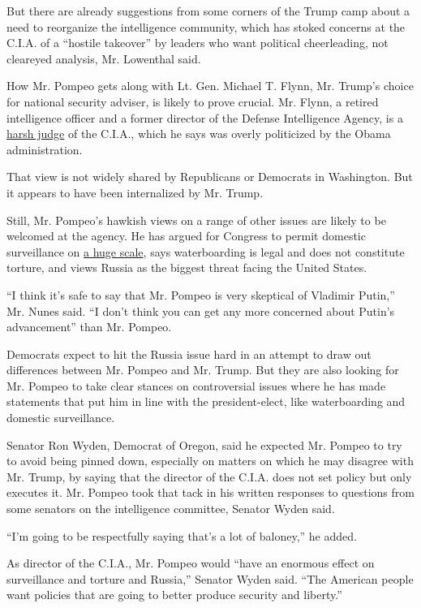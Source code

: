 But there are already suggestions from some corners of the Trump camp
about a need to reorganize the intelligence community, which has stoked
concerns at the C.I.A. of a ``hostile takeover'' by leaders who want
political cheerleading, not cleareyed analysis, Mr. Lowenthal said.

How Mr. Pompeo gets along with Lt. Gen. Michael T. Flynn, Mr. Trump's
choice for national security adviser, is likely to prove crucial. Mr.
Flynn, a retired intelligence officer and a former director of the
Defense Intelligence Agency, is a
\href{https://www.nytimes.com/2016/12/12/us/politics/donald-trump-cia-michael-flynn.html}{harsh
judge} of the C.I.A., which he says was overly politicized by the Obama
administration.

That view is not widely shared by Republicans or Democrats in
Washington. But it appears to have been internalized by Mr. Trump.

Still, Mr. Pompeo's hawkish views on a range of other issues are likely
to be welcomed at the agency. He has argued for Congress to permit
domestic surveillance on
\href{http://www.wsj.com/articles/time-for-a-rigorous-national-debate-about-surveillance-1451856106}{a
huge scale}, says waterboarding is legal and does not constitute
torture, and views Russia as the biggest threat facing the United
States.

``I think it's safe to say that Mr. Pompeo is very skeptical of Vladimir
Putin,'' Mr. Nunes said. ``I don't think you can get any more concerned
about Putin's advancement'' than Mr. Pompeo.

Democrats expect to hit the Russia issue hard in an attempt to draw out
differences between Mr. Pompeo and Mr. Trump. But they are also looking
for Mr. Pompeo to take clear stances on controversial issues where he
has made statements that put him in line with the president-elect, like
waterboarding and domestic surveillance.

Senator Ron Wyden, Democrat of Oregon, said he expected Mr. Pompeo to
try to avoid being pinned down, especially on matters on which he may
disagree with Mr. Trump, by saying that the director of the C.I.A. does
not set policy but only executes it. Mr. Pompeo took that tack in his
written responses to questions from some senators on the intelligence
committee, Senator Wyden said.

``I'm going to be respectfully saying that's a lot of baloney,'' he
added.

As director of the C.I.A., Mr. Pompeo would ``have an enormous effect on
surveillance and torture and Russia,'' Senator Wyden said. ``The
American people want policies that are going to better produce security
and liberty.''

